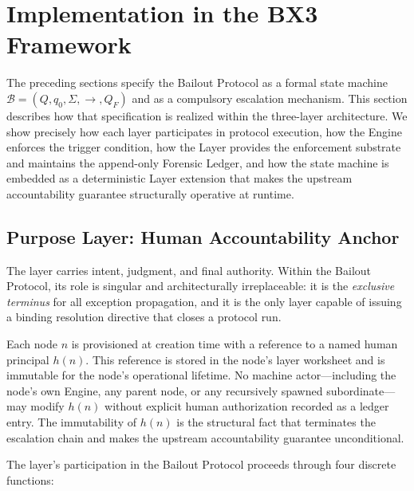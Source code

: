 \section{Implementation in the BX3 Framework}\label{sec:implementation}

The preceding sections specify the Bailout Protocol as a formal state machine
$\mathcal{B} = (Q, q_0, \Sigma, \rightarrow, Q_F)$ and as a compulsory escalation
mechanism.  This section describes how that specification is realized within the
\bxthree{} three-layer architecture.  We show precisely how each layer
participates in protocol execution, how the \bounds{} Engine enforces the
trigger condition, how the \fact{} Layer provides the enforcement substrate and
maintains the append-only Forensic Ledger, and how the state machine is embedded
as a deterministic \fact{} Layer extension that makes the upstream accountability
guarantee structurally operative at runtime.

\subsection{Purpose Layer: Human Accountability Anchor}\label{sec:purpose-layer}

The \purpose{} layer carries intent, judgment, and final authority.  Within the
Bailout Protocol, its role is singular and architecturally irreplaceable: it is
the \emph{exclusive terminus} for all exception propagation, and it is the only
layer capable of issuing a binding resolution directive that closes a protocol
run.

Each \bxthree{} node $n$ is provisioned at creation time with a reference to a
named human principal $h(n)$.  This reference is stored in the node's
\purpose{} layer worksheet and is immutable for the node's operational
lifetime.  No machine actor---including the node's own \bounds{} Engine, any
parent node, or any recursively spawned subordinate---may modify $h(n)$ without
explicit human authorization recorded as a ledger entry.  The immutability of
$h(n)$ is the structural fact that terminates the escalation chain and makes
the upstream accountability guarantee unconditional.

The \purpose{} layer's participation in the Bailout Protocol proceeds through
four discrete functions:

